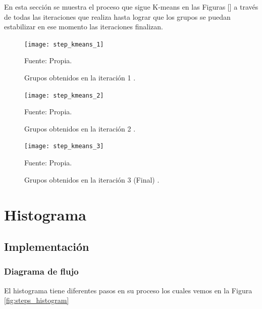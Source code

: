 En esta sección se muestra el proceso que sigue K-means en las Figuras [] a través de todas las iteraciones que realiza hasta lograr que los grupos se puedan estabilizar en ese momento las iteraciones finalizan.

\begin{figure}[ht]
	\begin{center}
		\texttt{[image: step\_kmeans\_1]}
	\end{center}
	\begin{center}
		\vskip -0.5cm
		\caption{\small{Grupos obtenidos en la iteración 1 .}}
		{\small{Fuente: Propia. }}
	\end{center}
\end{figure}

\begin{figure}[ht]
	\begin{center}
		\texttt{[image: step\_kmeans\_2]}
	\end{center}
	\begin{center}
		\vskip -0.5cm
		\caption{\small{Grupos obtenidos en la iteración 2 .}}
		{\small{Fuente: Propia. }}
	\end{center}
\end{figure}

\begin{figure}[ht]
	\begin{center}
		\texttt{[image: step\_kmeans\_3]}
	\end{center}
	\begin{center}
		\vskip -0.5cm
		\caption{\small{Grupos obtenidos en la iteración 3 (Final) .}}
		{\small{Fuente: Propia. }}
	\end{center}
\end{figure}


\section{Histograma}

\subsection{Implementación}

\subsubsection{Diagrama de flujo}

El histograma tiene diferentes pasos en su proceso los cuales vemos en la Figura \ref{fig:steps_histogram}

